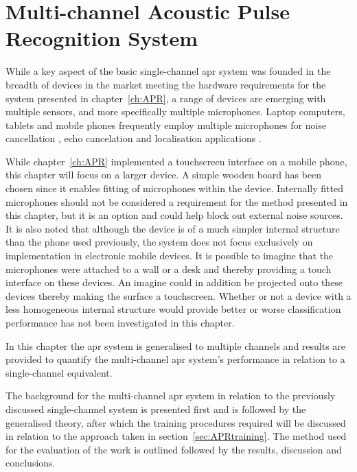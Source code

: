 \chapter{Multi-channel Acoustic Pulse Recognition System}\label{ch:MultichannelAPR}

\ifpdf
    \graphicspath{{Chapter4_MultiAPR/Chapter4Figs/PNG/}{Chapter4_MultiAPR/Chapter4Figs/PDF/}{Chapter4_MultiAPR/Chapter4Figs/}{Chapter4_MultiAPR/Chapter4Figs/Training/}}
\else
    \graphicspath{{Chapter4_MultiAPR/Chapter4Figs/EPS/}{Chapter4_MultiAPR/Chapter4Figs/}}
\fi

While a key aspect of the basic single-channel \gls{apr} system was founded in the breadth of devices in the market meeting the hardware requirements for the system presented in chapter~\ref{ch:APR}, a range of devices are emerging with multiple sensors, and more specifically multiple microphones. Laptop computers, tablets and mobile phones frequently employ multiple microphones for noise cancellation \cite{Habets2013}\cite{Habets2012}, echo cancelation \cite{US7925007} and localisation applications \cite{US8174547}\linebreak[2]\cite{US8233353}.

While chapter~\ref{ch:APR} implemented a touchscreen interface on a mobile phone, this chapter will focus on a larger device. A simple wooden board has been chosen since it enables fitting of microphones within the device. Internally fitted microphones should not be considered a requirement for the method presented in this chapter, but it is an option and could help block out external noise sources. It is also noted that although the device is of a much simpler internal structure than the phone used previously, the system does not focus exclusively on implementation in electronic mobile devices. It is possible to imagine that the microphones were attached to a wall or a desk and thereby providing a touch interface on these devices. An imagine could in addition be projected onto these devices thereby making the surface a touchscreen. Whether or not a device with a less homogeneous internal structure would provide better or worse classification performance has not been investigated in this chapter.

In this chapter the \gls{apr} system is generalised to multiple channels and results are provided to quantify the multi-channel \gls{apr} system's performance in relation to a single-channel equivalent.

The background for the multi-channel \gls{apr} system in relation to the previously discussed single-channel system is presented first and is followed by the generalised theory, after which the training procedures required will be discussed in relation to the approach taken in section~\ref{sec:APRtraining}. The method used for the evaluation of the work is outlined followed by the results, discussion and conclusions.

